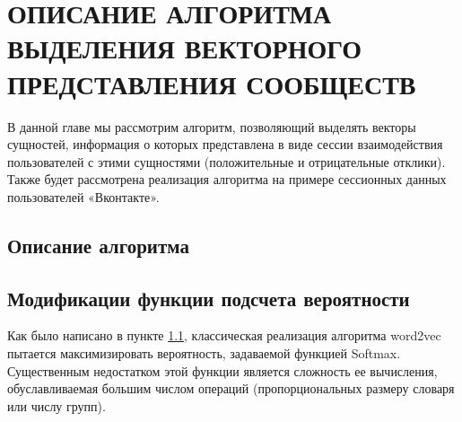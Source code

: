 \documentclass[times,specification,annotation]{itmo-student-thesis}
\begin{document}



\finishrelatedwork

\chapter{ОПИСАНИЕ АЛГОРИТМА ВЫДЕЛЕНИЯ ВЕКТОРНОГО ПРЕДСТАВЛЕНИЯ СООБЩЕСТВ}

В данной главе мы рассмотрим алгоритм, позволяющий выделять векторы
сущностей, информация о которых представлена в виде сессии взаимодействия
пользователей с этими сущностями (положительные и отрицательные отклики).
Также будет рассмотрена реализация алгоритма на примере сессионных данных
пользователей «Вконтакте».


\section{Описание алгоритма}\label{sec:algo}

\section{Модификации функции подсчета вероятности }
Как было написано в пункте \ref{sec:algo}, классическая реализация
алгоритма word2vec пытается максимизировать вероятность, задаваемой функцией
Softmax. Существенным недостатком этой функции является сложность ее
вычисления, обуславливаемая большим числом операций (пропорциональных
размеру словаря или числу групп).
\end{document}
